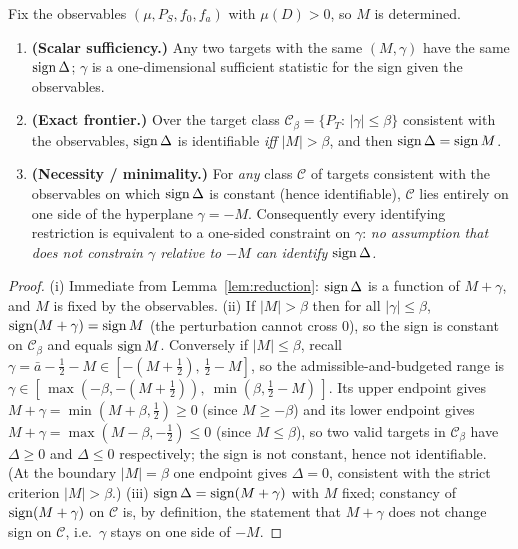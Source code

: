 \begin{theorem}\label{thm:frontier}
Fix the observables $(\mu,P_S,f_0,f_a)$ with $\mu(D)>0$, so $M$ is determined.
\begin{enumerate}\itemsep1pt
\item[\textnormal{(i)}] \textbf{(Scalar sufficiency.)} Any two targets with the same
$(M,\gamma)$ have the same $\operatorname{sign}\Delta$; $\gamma$ is a one-dimensional sufficient statistic
for the sign given the observables.
\item[\textnormal{(ii)}] \textbf{(Exact frontier.)} Over the target class
$\mathcal C_\beta=\{P_T:\,|\gamma|\le\beta\}$ consistent with the observables, $\operatorname{sign}\Delta$
is identifiable \emph{iff} $|M|>\beta$, and then $\operatorname{sign}\Delta=\operatorname{sign} M$.
\item[\textnormal{(iii)}] \textbf{(Necessity / minimality.)} For \emph{any} class
$\mathcal C$ of targets consistent with the observables on which $\operatorname{sign}\Delta$ is constant
(hence identifiable), $\mathcal C$ lies entirely on one side of the hyperplane
$\gamma=-M$. Consequently every identifying restriction is equivalent to a one-sided
constraint on $\gamma$: \emph{no assumption that does not constrain $\gamma$ relative to
$-M$ can identify $\operatorname{sign}\Delta$.}
\end{enumerate}
\end{theorem}
\begin{proof}
(i) Immediate from Lemma~\ref{lem:reduction}: $\operatorname{sign}\Delta$ is a function of $M+\gamma$, and
$M$ is fixed by the observables. (ii) If $|M|>\beta$ then for all $|\gamma|\le\beta$,
$\operatorname{sign}(M+\gamma)=\operatorname{sign} M$ (the perturbation cannot cross $0$), so the sign is constant on
$\mathcal C_\beta$ and equals $\operatorname{sign} M$. Conversely if $|M|\le\beta$, recall
$\gamma=\bar a-\tfrac12-M\in[-(M+\tfrac12),\,\tfrac12-M]$, so the admissible-and-budgeted
range is $\gamma\in[\,\max(-\beta,-(M+\tfrac12)),\ \min(\beta,\tfrac12-M)\,]$. Its upper
endpoint gives $M+\gamma=\min(M+\beta,\tfrac12)\ge0$ (since $M\ge-\beta$) and its lower
endpoint gives $M+\gamma=\max(M-\beta,-\tfrac12)\le0$ (since $M\le\beta$), so two valid
targets in $\mathcal C_\beta$ have $\Delta\ge0$ and $\Delta\le0$ respectively; the sign is
not constant, hence not identifiable. (At the boundary $|M|=\beta$ one endpoint gives
$\Delta=0$, consistent with the strict criterion $|M|>\beta$.)
(iii) $\operatorname{sign}\Delta=\operatorname{sign}(M+\gamma)$ with $M$ fixed; constancy of $\operatorname{sign}(M+\gamma)$ on
$\mathcal C$ is, by definition, the statement that $M+\gamma$ does not change sign on
$\mathcal C$, i.e.\ $\gamma$ stays on one side of $-M$.
\end{proof}

